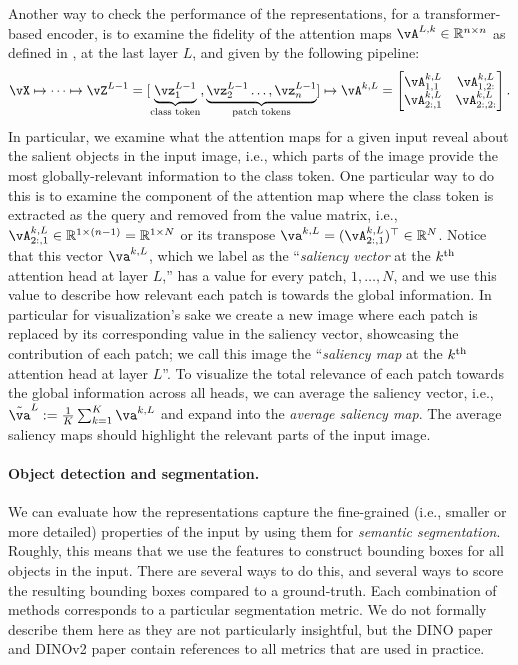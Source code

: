 \documentclass[\toplevelprefix/book-main.tex]{subfiles}
\begin{document}
Another way to check the performance of the representations, for a transformer-based encoder, is to examine the fidelity of the attention maps \(\vA^{L, k} \in \R^{n \times n}\) as defined in , at the last layer \(L\), and given by the following pipeline:
\begin{align}
    \vX \mapsto \cdots \mapsto \vZ^{L - 1} = [\underbrace{\vz_{1}^{L - 1}}_{\text{class token}}, \underbrace{\vz_{2}^{L - 1} \dots, \vz_{n}^{L - 1}}_{\text{patch tokens}}] \mapsto \vA^{k, L} = \mat{\vA_{1, 1}^{k, L} & \vA_{1, 2:}^{k, L} \\ \vA_{2:, 1}^{k, L} & \vA_{2:, 2:}^{k, L}}.
\end{align}
In particular, we examine what the attention maps for a given input reveal about the salient objects in the input image, i.e., which parts of the image provide the most globally-relevant information to the class token. One particular way to do this is to examine the component of the attention map where the class token is extracted as the query and removed from the value matrix, i.e., \(\vA_{2:, 1}^{k, L} \in \R^{1 \times (n - 1)} = \R^{1 \times N}\) or its transpose \(\va^{k, L} = (\vA_{2:, 1}^{k, L})^{\top} \in \R^{N}\). Notice that this vector \(\va^{k, L}\), which we label as the ``\textit{saliency vector} at the \(k^{\textnormal{th}}\) attention head at layer \(L\),'' has a value for every patch, \(1, \dots, N\), and we use this value to describe how relevant each patch is towards the global information. In particular for visualization's sake we create a new image where each patch is replaced by its corresponding value in the saliency vector, showcasing the contribution of each patch; we call this image the ``\textit{saliency map} at the \(k^{\textnormal{th}}\) attention head at layer \(L\)''. To visualize the total relevance of each patch towards the global information across all heads, we can average the saliency vector, i.e., \(\tilde{\va}^{L} := \frac{1}{K}\sum_{k = 1}^{K}\va^{k, L}\) and expand into the \textit{average saliency map}. The average saliency maps should highlight the relevant parts of the input image.


\paragraph{Object detection and segmentation.}

We can evaluate how the representations capture the fine-grained (i.e., smaller or more detailed) properties of the input by using them for \textit{semantic segmentation}. Roughly, this means that we use the features to construct bounding boxes for all objects in the input. There are several ways to do this, and several ways to score the resulting bounding boxes compared to a ground-truth. Each combination of methods corresponds to a particular segmentation metric. We do not formally describe them here as they are not particularly insightful, but the DINO paper \citep{caron2021emerging} and DINOv2 paper \citep{oquab2023dinov2} contain references to all metrics that are used in practice.
\end{document}
